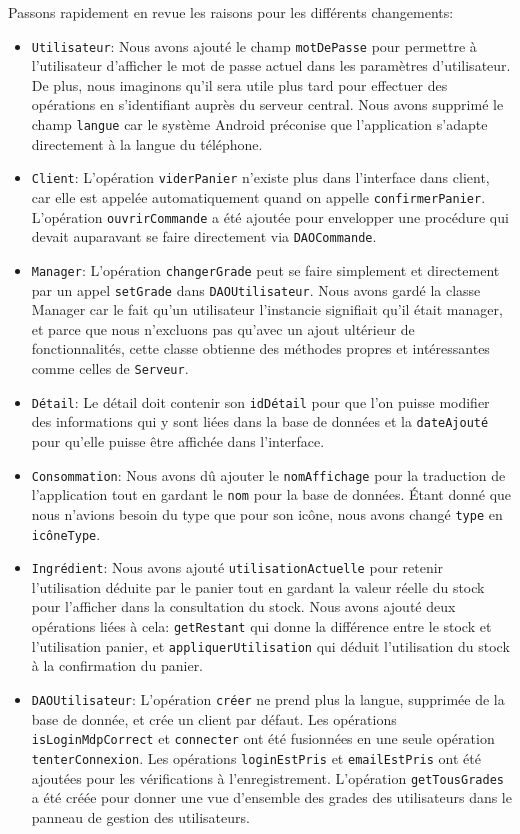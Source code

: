 \documentclass[a4paper,10pt]{article}
\begin{document}
Passons rapidement en revue les raisons pour les différents changements:
\begin{itemize}
    \item \texttt{Utilisateur}: Nous avons ajouté le champ \texttt{motDePasse} pour permettre à l'utilisateur d'afficher le mot de passe actuel dans les paramètres d'utilisateur. De plus, nous imaginons qu'il sera utile plus tard pour effectuer des opérations en s'identifiant auprès du serveur central. Nous avons supprimé le champ \texttt{langue} car le système Android préconise que l'application s'adapte directement à la langue du téléphone.
    \item \texttt{Client}: L'opération \texttt{viderPanier} n'existe plus dans l'interface dans client, car elle est appelée automatiquement quand on appelle \texttt{confirmerPanier}. L'opération \texttt{ouvrirCommande} a été ajoutée pour envelopper une procédure qui devait auparavant se faire directement via \texttt{DAOCommande}.
    \item \texttt{Manager}: L'opération \texttt{changerGrade} peut se faire simplement et directement par un appel \texttt{setGrade} dans \texttt{DAOUtilisateur}. Nous avons gardé la classe Manager car le fait qu'un utilisateur l'instancie signifiait qu'il était manager, et parce que nous n'excluons pas qu'avec un ajout ultérieur de fonctionnalités, cette classe obtienne des méthodes propres et intéressantes comme celles de \texttt{Serveur}.
    \item \texttt{Détail}: Le détail doit contenir son \texttt{idDétail} pour que l'on puisse modifier des informations qui y sont liées dans la base de données et la \texttt{dateAjouté} pour qu'elle puisse être affichée dans l'interface.
    \item \texttt{Consommation}: Nous avons dû ajouter le \texttt{nomAffichage} pour la traduction de l'application tout en gardant le \texttt{nom} pour la base de données. Étant donné que nous n'avions besoin du type que pour son icône, nous avons changé \texttt{type} en \texttt{icôneType}.
    \item \texttt{Ingrédient}: Nous avons ajouté \texttt{utilisationActuelle} pour retenir l'utilisation déduite par le panier tout en gardant la valeur réelle du stock pour l'afficher dans la consultation du stock. Nous avons ajouté deux opérations liées à cela: \texttt{getRestant} qui donne la différence entre le stock et l'utilisation panier, et \texttt{appliquerUtilisation} qui déduit l'utilisation du stock à la confirmation du panier.
    \item \texttt{DAOUtilisateur}: L'opération \texttt{créer} ne prend plus la langue, supprimée de la base de donnée, et crée un client par défaut. Les opérations \texttt{isLoginMdpCorrect} et \texttt{connecter} ont été fusionnées en une seule opération \texttt{tenterConnexion}. Les opérations \texttt{loginEstPris} et \texttt{emailEstPris} ont été ajoutées pour les vérifications à l'enregistrement. L'opération \texttt{getTousGrades} a été créée pour donner une vue d'ensemble des grades des utilisateurs dans le panneau de gestion des utilisateurs.

\end{itemize}
\end{document}

